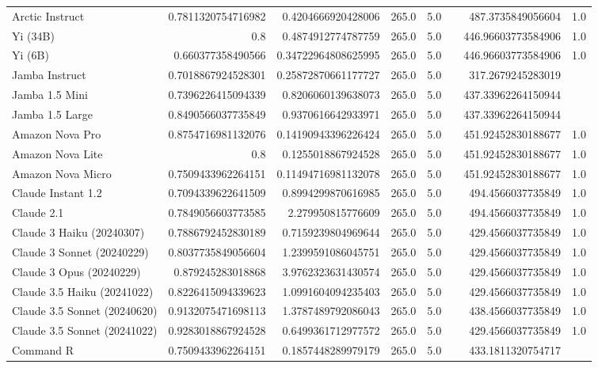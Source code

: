 \begin{table}[htp]
{\begin{tabular}{lrrrrrrr}
Arctic Instruct & 0.7811320754716982 & 0.4204666920428006 & 265.0 & 5.0 &  & 487.3735849056604 & 1.0 \\
Yi (34B) & 0.8 & 0.4874912774787759 & 265.0 & 5.0 &  & 446.96603773584906 & 1.0 \\
Yi (6B) & 0.660377358490566 & 0.34722964808625995 & 265.0 & 5.0 &  & 446.96603773584906 & 1.0 \\
Jamba Instruct & 0.7018867924528301 & 0.25872870661177727 & 265.0 & 5.0 &  & 317.2679245283019 &  \\
Jamba 1.5 Mini & 0.7396226415094339 & 0.8206060139638073 & 265.0 & 5.0 &  & 437.33962264150944 &  \\
Jamba 1.5 Large & 0.8490566037735849 & 0.9370616642933971 & 265.0 & 5.0 &  & 437.33962264150944 &  \\
Amazon Nova Pro & 0.8754716981132076 & 0.14190943396226424 & 265.0 & 5.0 &  & 451.92452830188677 & 1.0 \\
Amazon Nova Lite & 0.8 & 0.1255018867924528 & 265.0 & 5.0 &  & 451.92452830188677 & 1.0 \\
Amazon Nova Micro & 0.7509433962264151 & 0.11494716981132078 & 265.0 & 5.0 &  & 451.92452830188677 & 1.0 \\
Claude Instant 1.2 & 0.7094339622641509 & 0.8994299870616985 & 265.0 & 5.0 &  & 494.4566037735849 & 1.0 \\
Claude 2.1 & 0.7849056603773585 & 2.279950815776609 & 265.0 & 5.0 &  & 494.4566037735849 & 1.0 \\
Claude 3 Haiku (20240307) & 0.7886792452830189 & 0.7159239804969644 & 265.0 & 5.0 &  & 429.4566037735849 & 1.0 \\
Claude 3 Sonnet (20240229) & 0.8037735849056604 & 1.2399591086045751 & 265.0 & 5.0 &  & 429.4566037735849 & 1.0 \\
Claude 3 Opus (20240229) & 0.879245283018868 & 3.9762323631430574 & 265.0 & 5.0 &  & 429.4566037735849 & 1.0 \\
Claude 3.5 Haiku (20241022) & 0.8226415094339623 & 1.0991604094235403 & 265.0 & 5.0 &  & 429.4566037735849 & 1.0 \\
Claude 3.5 Sonnet (20240620) & 0.9132075471698113 & 1.3787489792086043 & 265.0 & 5.0 &  & 438.4566037735849 & 1.0 \\
Claude 3.5 Sonnet (20241022) & 0.9283018867924528 & 0.6499361712977572 & 265.0 & 5.0 &  & 429.4566037735849 & 1.0 \\
Command R & 0.7509433962264151 & 0.1857448289979179 & 265.0 & 5.0 &  & 433.1811320754717 &  \\

\end{tabular}}
\end{table}
